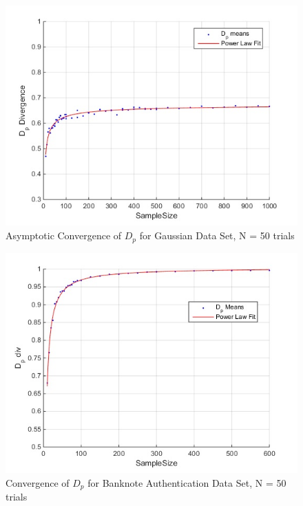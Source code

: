 \documentclass{article}
\begin{document}
	\begin{figure}[h!]
		\caption{Asymptotic Convergence of $D_p$ for Gaussian Data Set, N = 50 trials}
		\centering
		\includegraphics[scale=0.6]{dp_n50_gaussian}
	\end{figure}	
	

	
	\newpage
	\begin{figure}[h!]
		\caption{Convergence of $D_p$ for Banknote Authentication Data Set, N = 50 trials}
		\centering
		\includegraphics[scale=0.6]{dp_n50_banknote}
	\end{figure}
	
\end{document}
